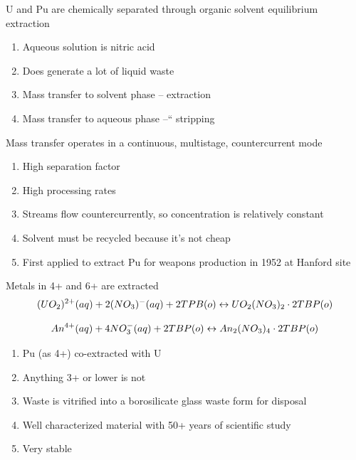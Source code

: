 \documentclass[aspectratio=1610,pdftex,dvipsnames,compress,xcolor={dvipsnames}]{beamer}
\begin{document}
\begin{frame}{U and Pu are chemically separated through organic solvent equilibrium extraction}
    \begin{enumerate}[topsep=0pt,itemsep=21pt,leftmargin=*,label=(\arabic*)]
        \item[]Aqueous solution is nitric acid
        \item[]Does generate a lot of liquid waste
        \item[]Mass transfer to solvent phase -- extraction  
        \item[]Mass transfer to aqueous phase --`` stripping
    \end{enumerate}
\end{frame}


\begin{frame}{Mass transfer operates in a continuous, multistage, countercurrent mode}
    \begin{enumerate}[topsep=0pt,itemsep=21pt,leftmargin=*,label=(\arabic*)]
        \item[]High separation factor
        \item[]High processing rates
        \item[]Streams flow countercurrently, so concentration is relatively constant
        \item[]Solvent must be recycled because it's not cheap
        \item[]First applied to extract Pu for weapons production in 1952 at Hanford site
    \end{enumerate}
\end{frame}


\begin{frame}{Metals in 4+ and 6+ are extracted}
    \begin{equation}
        \Large
        (UO_2)^{2+}(aq) + 2(NO_3)^-(aq) + 2TPB(o) \leftrightarrow UO_2(NO_3)_2 \cdot 2TBP(o)
    \end{equation}
    
    \begin{equation}
        \Large
        An^{4+}(aq) + 4NO_3^-(aq) + 2TBP(o) \leftrightarrow An_2(NO_3)_4 \cdot 2TBP(o)
    \end{equation}

    \vspace*{\fill}

    \begin{enumerate}[topsep=0pt,itemsep=18pt,leftmargin=*,label=(\arabic*)]
        \item[]Pu (as 4+) co-extracted with U
        \item[]Anything 3+ or lower is not
        \item[]Waste is vitrified into a borosilicate glass waste form for disposal
        \item[]Well characterized material with 50+ years of scientific study
        \item[]Very stable
    \end{enumerate}
\end{frame}
\end{document}

